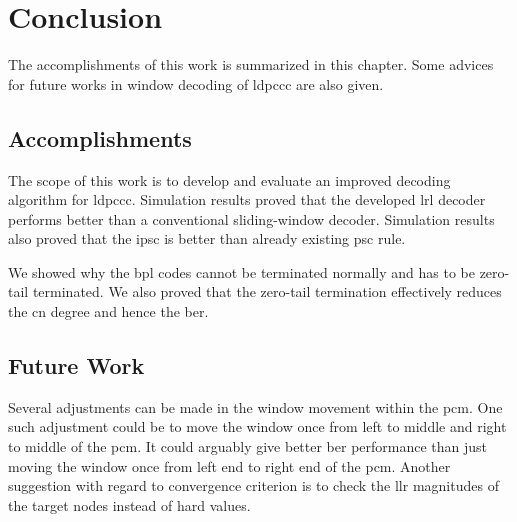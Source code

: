 \chapter{Conclusion}\label{ch:conclu}
The accomplishments of this work is summarized in this chapter. Some advices for future works in window decoding of \gls{ldpccc} are also given.

\section{Accomplishments}
The scope of this work is to develop and evaluate an improved decoding algorithm for \gls{ldpccc}. Simulation results proved that the developed \acrfull{lrl} decoder performs better than a conventional sliding-window decoder. Simulation results also proved that the \acrfull{ipsc} is better than already existing \acrfull{psc} rule.

We showed why the \gls{bpl} codes cannot be terminated normally and has to be zero-tail terminated. We also proved that the zero-tail termination effectively reduces the \gls{cn} degree and hence the \gls{ber}.

\section{Future Work}
Several adjustments can be made in the window movement within the \gls{pcm}. One such adjustment could be to move the window once from left to middle and right to middle of the \gls{pcm}. It could arguably give better \gls{ber} performance than just moving the window once from left end to right end of the \gls{pcm}. Another suggestion with regard to convergence criterion is to check the \gls{llr} magnitudes of the target nodes instead of hard values.